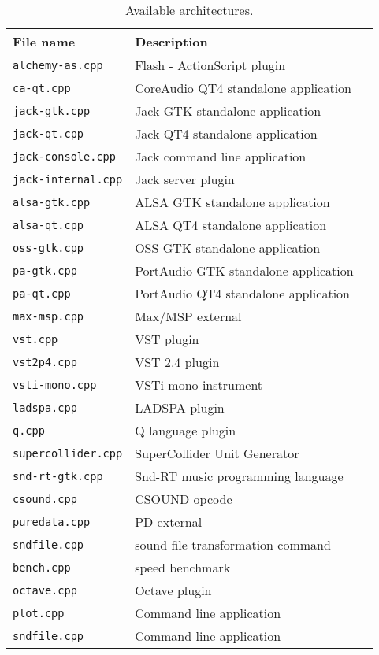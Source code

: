 \begin{table}[htdp]
\begin{center}
\begin{tabular}{|l|l|l|}
\hline
\textbf{File name}			& \textbf{Description}   \\
\hline
\texttt{alchemy-as.cpp} 	& Flash - ActionScript plugin \\
\texttt{ca-qt.cpp} 			& CoreAudio QT4 standalone application  \\
\texttt{jack-gtk.cpp} 		& Jack GTK standalone application  \\
\texttt{jack-qt.cpp} 		& Jack QT4 standalone application  \\
\texttt{jack-console.cpp} 	& Jack command line application  \\
\texttt{jack-internal.cpp} 	& Jack server plugin  \\
\texttt{alsa-gtk.cpp} 		& ALSA GTK standalone application  \\
\texttt{alsa-qt.cpp} 		& ALSA QT4 standalone application  \\
\texttt{oss-gtk.cpp} 		& OSS GTK standalone application  \\
\texttt{pa-gtk.cpp} 		& PortAudio GTK standalone application  \\
\texttt{pa-qt.cpp} 			& PortAudio QT4 standalone application  \\
\hline
\texttt{max-msp.cpp} 		& Max/MSP external  \\
\texttt{vst.cpp} 			& VST plugin  \\
\texttt{vst2p4.cpp} 		& VST 2.4 plugin  \\
\texttt{vsti-mono.cpp} 		& VSTi mono instrument  \\
\texttt{ladspa.cpp} 		& LADSPA plugin  \\
\texttt{q.cpp} 				& Q language plugin  \\
\texttt{supercollider.cpp} 	& SuperCollider Unit Generator  \\
\texttt{snd-rt-gtk.cpp} 	& Snd-RT music programming language  \\
\texttt{csound.cpp} 		& CSOUND opcode  \\
\texttt{puredata.cpp} 		& PD external  \\
\hline
\texttt{sndfile.cpp} 		& sound file transformation command \\
\texttt{bench.cpp} 			& speed benchmark   \\
\texttt{octave.cpp} 		& Octave plugin   \\
\texttt{plot.cpp} 			& Command line application    \\
\texttt{sndfile.cpp} 		& Command line application    \\
\hline
\end{tabular}
\end{center}
\caption{Available architectures.}
\label{tab:availablearch}
\end{table}%


